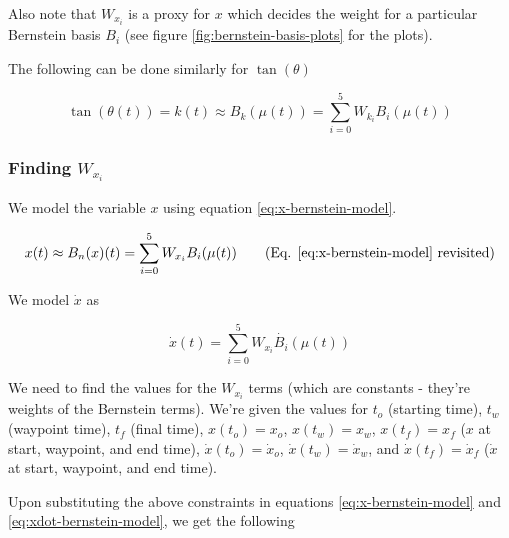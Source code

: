 Also note that $W_{x_i}$ is a proxy for $x$ which decides the weight for a particular Bernstein basis $B_i$ (see figure \ref{fig:bernstein-basis-plots} for the plots).

The following can be done similarly for $\tan(\theta)$

\begin{equation}
    \tan \left( \theta(t) \right) = k(t) \approx B_k(\mu(t)) = \sum_{i = 0}^{5} W_{k_i} B_i (\mu(t))
    \label{eq:tan-bernstein-model}
\end{equation}

\subsubsection{Finding \texorpdfstring{$W_{x_i}$}{weights for x}}

We model the variable $x$ using equation \ref{eq:x-bernstein-model}.

\begin{equation}
    x(t) \approx B_n(x)(t) = \sum_{i = 0}^{5} W_{x_i} B_i (\mu(t))
    \tag{Eq. \ref{eq:x-bernstein-model} revisited}
\end{equation}

We model $\dot{x}$ as

\begin{equation}
    \dot{x}(t) = \sum_{i = 0}^{5} W_{x_i} \dot{B_i} (\mu(t))
    \label{eq:xdot-bernstein-model}
\end{equation}

We need to find the values for the $W_{x_i}$ terms (which are constants - they're weights of the Bernstein terms). We're given the values for $t_o$ (starting time), $t_w$ (waypoint time), $t_f$ (final time), $x(t_o) = x_o$, $x(t_w) = x_w$, $x(t_f) = x_f$ ($x$ at start, waypoint, and end time), $\dot{x}(t_o) = \dot{x}_o$, $\dot{x}(t_w) = \dot{x}_w$, and $\dot{x}(t_f) = \dot{x}_f$ ($\dot{x}$ at start, waypoint, and end time).

Upon substituting the above constraints in equations \ref{eq:x-bernstein-model} and \ref{eq:xdot-bernstein-model}, we get the following

